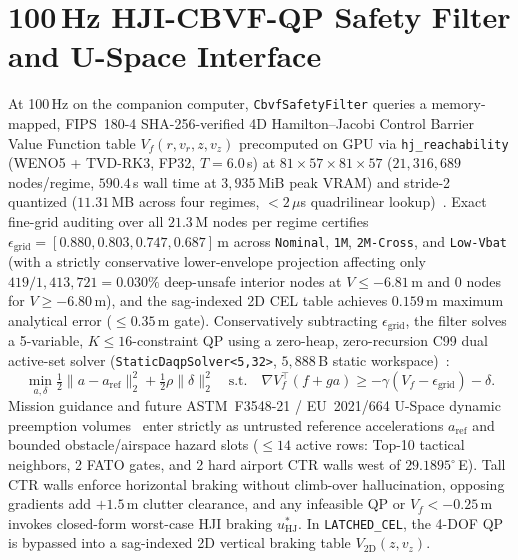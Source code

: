 \documentclass[letterpaper, 10 pt, journal, twoside]{IEEEtran}
\begin{document}
\section{100\,Hz HJI-CBVF-QP Safety Filter and U-Space Interface}
\label{sec:cbvf}

At 100\,Hz on the companion computer, \texttt{CbvfSafetyFilter} queries a memory-mapped, FIPS~180-4 SHA-256-verified 4D Hamilton--Jacobi Control Barrier Value Function table $V_f(r,v_r,z,v_z)$ precomputed on GPU via \texttt{hj\_reachability} (WENO5 + TVD-RK3, FP32, $T=6.0$\,s) at $81\times 57\times 81\times 57$ ($21{,}316{,}689$ nodes/regime, $590.4$\,s wall time at $3{,}935$\,MiB peak VRAM) and stride-2 quantized ($11.31$\,MB across four regimes, $<2\,\mu$s quadrilinear lookup)~\cite{choi_cbvf_2021}. Exact fine-grid auditing over all $21.3$\,M nodes per regime certifies $\epsilon_{\text{grid}}=[0.880,0.803,0.747,0.687]$\,m across \texttt{Nominal}, \texttt{1M}, \texttt{2M-Cross}, and \texttt{Low-Vbat} (with a strictly conservative lower-envelope projection affecting only $419/1{,}413{,}721=0.030\%$ deep-unsafe interior nodes at $V\le -6.81$\,m and $0$ nodes for $V\ge -6.80$\,m), and the sag-indexed 2D CEL table achieves $0.159$\,m maximum analytical error ($\le 0.35$\,m gate). Conservatively subtracting $\epsilon_{\text{grid}}$, the filter solves a 5-variable, $K\le 16$-constraint QP using a zero-heap, zero-recursion C99 dual active-set solver (\texttt{StaticDaqpSolver<5,32>}, $5{,}888$\,B static workspace)~\cite{arnstrom_daqp_2022}:
\begin{equation}
  \min_{a,\delta} \tfrac{1}{2}\|a - a_{\text{ref}}\|_2^2 + \tfrac{1}{2}\rho\|\delta\|_2^2 \quad \text{s.t.}\quad \nabla V_f^\top(f + g a) \ge -\gamma(V_f - \epsilon_{\text{grid}}) - \delta.
  \label{eq:cbvf}
\end{equation}
Mission guidance and future ASTM~F3548-21 / EU~2021/664 U-Space dynamic preemption volumes~\cite{astm_f3548_2021,eu_uspace_2021} enter strictly as untrusted reference accelerations $a_{\text{ref}}$ and bounded obstacle/airspace hazard slots ($\le 14$ active rows: Top-10 tactical neighbors, 2 FATO gates, and 2 hard airport CTR walls west of $29.1895^\circ$\,E). Tall CTR walls enforce horizontal braking without climb-over hallucination, opposing gradients add $+1.5$\,m clutter clearance, and any infeasible QP or $V_f<-0.25$\,m invokes closed-form worst-case HJI braking $u^*_{\text{HJ}}$. In \texttt{LATCHED\_CEL}, the 4-DOF QP is bypassed into a sag-indexed 2D vertical braking table $V_{\text{2D}}(z,v_z)$.
\end{document}
